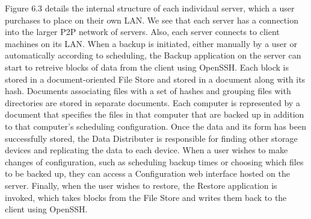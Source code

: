  Figure 6.3 details the internal structure of each individaul server, which a user purchases to place on their own LAN.  We see that each server has a connection into the larger P2P network of servers.  Also, each server connects to client machines on its LAN.  When a backup is initiated, either manually by a user or automatically according to scheduling, the Backup application on the server can start to retreive blocks of data from the client using OpenSSH.  Each block is stored in a document-oriented File Store and stored in a document along with its hash. Documents associating files with a set of hashes and grouping files with directories are stored in separate documents. Each computer is represented by a document that specifies the files in that computer that are backed up in addition to that computer's scheduling configuration. Once the data and its form has been successfully stored, the Data Distributer is responsible for finding other storage devices and replicating the data to each device.  When a user wishes to make changes of configuration, such as scheduling backup times or choosing which files to be backed up, they can access a Configuration web interface hosted on the server.  Finally, when the user wishes to restore, the Restore application is invoked, which takes blocks from the File Store and writes them back to the client using OpenSSH.

%

